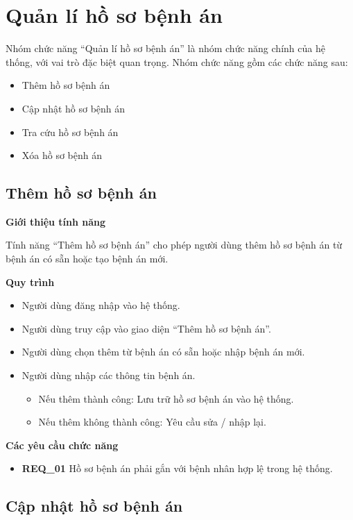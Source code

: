 \section{Quản lí hồ sơ bệnh án}

Nhóm chức năng ``Quản lí hồ sơ bệnh án'' là nhóm chức năng chính của hệ thống, với vai trò đặc biệt quan trọng. Nhóm chức năng gồm các chức năng sau:
\begin{itemize}
  \item Thêm hồ sơ bệnh án
  \item Cập nhật hồ sơ bệnh án
  \item Tra cứu hồ sơ bệnh án
  \item Xóa hồ sơ bệnh án
\end{itemize}

\subsection{Thêm hồ sơ bệnh án}

\noindent \textbf{Giới thiệu tính năng}

Tính năng ``Thêm hồ sơ bệnh án'' cho phép người dùng thêm hồ sơ bệnh án từ bệnh án có sẵn hoặc tạo bệnh án mới.

\noindent \textbf{Quy trình}
\begin{itemize}
  \item Người dùng đăng nhập vào hệ thống.
  \item Người dùng truy cập vào giao diện ``Thêm hồ sơ bệnh án''.
  \item Người dùng chọn thêm từ bệnh án có sẵn hoặc nhập bệnh án mới.
  \item Người dùng nhập các thông tin bệnh án.
    \begin{itemize}
      \item Nếu thêm thành công: Lưu trữ hồ sơ bệnh án vào hệ thống.
      \item Nếu thêm không thành công: Yêu cầu sửa / nhập lại.
    \end{itemize}
\end{itemize}

\noindent \textbf{Các yêu cầu chức năng}
\begin{itemize}
  \item \textbf{REQ\_01} Hồ sơ bệnh án phải gắn với bệnh nhân hợp lệ trong hệ thống.
\end{itemize}

\subsection{Cập nhật hồ sơ bệnh án}

